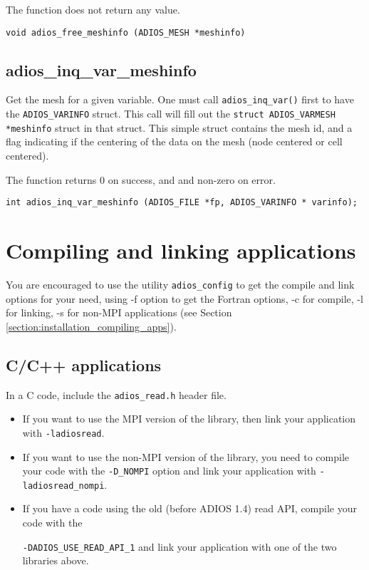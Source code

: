 \noindent The function does not return any value.

\begin{lstlisting}
void adios_free_meshinfo (ADIOS_MESH *meshinfo)
\end{lstlisting}

\subsection{adios\_inq\_var\_meshinfo}

\noindent Get the mesh for a given variable. One must call \verb+adios_inq_var()+ first to have the \verb+ADIOS_VARINFO+ struct. This call will fill out the \verb+struct ADIOS_VARMESH *meshinfo+ struct in that struct.
This simple struct contains the mesh id, and a flag indicating if the centering of the data on the mesh (node centered or cell centered).

\noindent The function returns 0 on success, and and non-zero on error.

\begin{lstlisting}
int adios_inq_var_meshinfo (ADIOS_FILE *fp, ADIOS_VARINFO * varinfo);
\end{lstlisting}
%
%
%
\section{Compiling and linking applications}

You are encouraged to use the utility \verb+adios_config+ to get the compile and link options for your 
need, using -f option to get the Fortran options, -c for compile, -l for linking, 
-s for non-MPI applications (see Section \ref{section:installation_compiling_apps}). 


\subsection{C/C++ applications}

In a C code, include the \verb+adios_read.h+ header file.  

\begin{itemize}
\item If you want to use the MPI version of the library, then link your application with \verb+-ladiosread+.

\item If you want to use the non-MPI version of the library, you need to compile your 
code with the \verb+-D_NOMPI+ option and link your application with \verb+-ladiosread_nompi+.

\item If you have a code using the old (before ADIOS 1.4) read API, compile your code with the

\verb+-DADIOS_USE_READ_API_1+ and link your application with one of the two libraries above.

\end{itemize}

